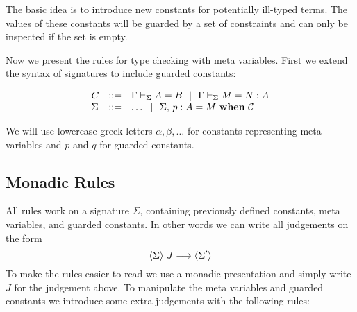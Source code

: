 
The basic idea is to introduce new constants for potentially ill-typed terms.  
The values of these constants will be guarded by a set of constraints and can
only be inspected if the set is empty.

Now we present the rules for type checking with meta variables. First we extend
the syntax of signatures to include guarded constants:

\[\begin{array}{lcll}
    C & ::= & \Gamma\vdash_{\Sigma}A=B ~~|~~
	      \Gamma\vdash_{\Sigma}M=N:A \\
    \Sigma & ::= & \ldots ~~|~~
		{\Sigma},\,{} {p} : {A} = {M} ~\mathbf{when}~ {\mathcal{C}} \\
\end{array}\]

We will use lowercase greek letters $\alpha, \beta, \ldots$ for constants
representing meta variables and $p$ and $q$ for guarded constants.

\subsection{Monadic Rules}

All rules work on a signature $\Sigma$, containing previously defined
constants, meta variables, and guarded constants.
%
In other words we can write all judgements on the form
\[\langle {\Sigma} \rangle ~{J} \longrightarrow \langle {\Sigma'} \rangle\]
%
To make the rules easier to read we use a monadic presentation and simply write
$J$ for the judgement above.
%
To manipulate the meta variables and guarded constants we introduce some extra
judgements with the following rules:




